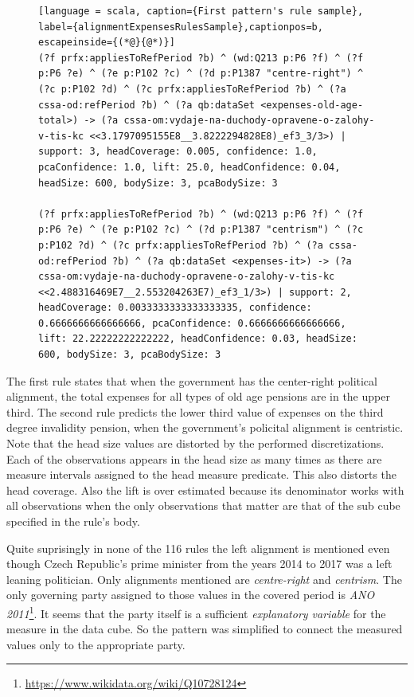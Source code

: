\begin{figure}[h]
\begin{lstlisting}[language = scala, caption={First pattern's rule sample}, label={alignmentExpensesRulesSample},captionpos=b, escapeinside={(*@}{@*)}]
(?f prfx:appliesToRefPeriod ?b) ^ (wd:Q213 p:P6 ?f) ^ (?f p:P6 ?e) ^ (?e p:P102 ?c) ^ (?d p:P1387 "centre-right") ^ (?c p:P102 ?d) ^ (?c prfx:appliesToRefPeriod ?b) ^ (?a cssa-od:refPeriod ?b) ^ (?a qb:dataSet <expenses-old-age-total>) -> (?a cssa-om:vydaje-na-duchody-opravene-o-zalohy-v-tis-kc <<3.1797095155E8__3.8222294828E8)_ef3_3/3>) | support: 3, headCoverage: 0.005, confidence: 1.0, pcaConfidence: 1.0, lift: 25.0, headConfidence: 0.04, headSize: 600, bodySize: 3, pcaBodySize: 3

(?f prfx:appliesToRefPeriod ?b) ^ (wd:Q213 p:P6 ?f) ^ (?f p:P6 ?e) ^ (?e p:P102 ?c) ^ (?d p:P1387 "centrism") ^ (?c p:P102 ?d) ^ (?c prfx:appliesToRefPeriod ?b) ^ (?a cssa-od:refPeriod ?b) ^ (?a qb:dataSet <expenses-it>) -> (?a cssa-om:vydaje-na-duchody-opravene-o-zalohy-v-tis-kc <<2.488316469E7__2.553204263E7)_ef3_1/3>) | support: 2, headCoverage: 0.0033333333333333335, confidence: 0.6666666666666666, pcaConfidence: 0.6666666666666666, lift: 22.22222222222222, headConfidence: 0.03, headSize: 600, bodySize: 3, pcaBodySize: 3
\end{lstlisting}
\end{figure}

The first rule states that when the government has the center-right political alignment, the total expenses for all types of old age pensions are in the upper third. The second rule predicts the lower third value of expenses on the third degree invalidity pension, when the government's policital alignment is centristic. Note that the head size values are distorted by the performed discretizations. Each of the  observations appears in the head size as many times as there are measure intervals assigned to the head measure predicate. This also distorts the head coverage. Also the lift is over estimated because its denominator works with all  observations when the only observations that matter are that of the sub cube specified in the rule's body.

Quite suprisingly in none of the 116 rules the left alignment is mentioned even though Czech Republic's prime minister from the years 2014 to 2017 was a left leaning politician. Only alignments mentioned are \textit{centre-right} and \textit{centrism}. The only governing party assigned to those values in the covered period is \textit{ANO 2011}\footnote{\href{https://www.wikidata.org/wiki/Q10728124}{https://www.wikidata.org/wiki/Q10728124}}. It seems that the party itself is a sufficient \textit{explanatory variable} for the measure in the data cube. So the pattern was simplified to connect the measured values only to the appropriate party.

